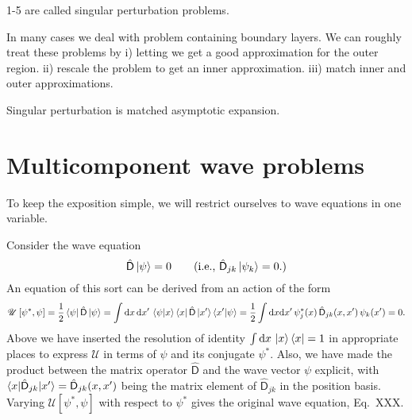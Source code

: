 1-5 are called singular perturbation problems.

In many cases we deal with problem containing boundary layers. We can roughly treat these problems by
i) letting  we get a good approximation for the outer region.
ii) rescale the problem to get an inner approximation.
iii) match inner and outer approximations.

Singular perturbation is matched asymptotic expansion.

\section{Multicomponent wave problems}

To keep the exposition simple, we will restrict ourselves to wave equations in one variable.

Consider the wave equation
%
\begin{equation}
  \hat{\mathsf{D}}\mathinner{\lvert{\psi}\rangle} = 0
  \qquad
  (\text{i.e., }\hat{\mathsf{D}}_{jk}\mathinner{\lvert{\psi_{k}}\rangle} = 0.)
\end{equation}
%
An equation of this sort can be derived from an action of the form
%
\begin{equation}
  \mathscr{U}\left[\psi^{*}, \psi\right] = \frac{1}{2}\mathinner{\langle{\psi}\rvert}\hat{\mathsf{D}}\mathinner{\lvert{\psi}\rangle}
  = \int \mathrm{d}{x}\,\mathrm{d}{x'}\, \mathinner{\langle{\psi|x}\rangle}\mathinner{\langle{x}\rvert}\hat{\mathsf{D}}\mathinner{\lvert{x'}\rangle}\mathinner{\langle{x'|\psi}\rangle}
  = \frac{1}{2}\int \mathrm{d}{x}\mathrm{d}{x'}\, \psi^{*}_{j}(x)\,\hat{\mathsf{D}}_{jk}(x, x')\,\psi_{k}(x') = 0.
\end{equation}
%
Above we have inserted the resolution of identity $\int \mathrm{d}{x}\,\mathinner{\lvert{x}\rangle}\mathinner{\langle{x}\rvert} = 1$ in appropriate places to express $\mathscr{U}$ in terms of $\psi$ and its conjugate $\psi^{*}$.
Also, we have made the product between the matrix operator $\hat{\mathsf{D}}$ and the wave vector $\psi$ explicit, with $\mathinner{\langle{x|\hat{\mathsf{D}}_{jk}|x'}\rangle} = \hat{\mathsf{D}}_{jk}(x, x')$ being the matrix element of $\hat{\mathsf{D}}_{jk}$ in the position basis.
Varying $\mathscr{U}[\psi^{*}, \psi]$ with respect to $\psi^{*}$ gives the original wave equation, Eq.~XXX.

